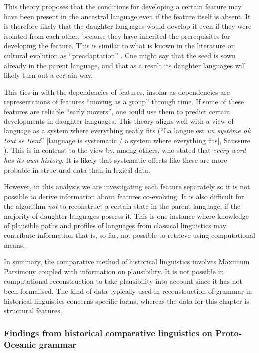 \documentclass[draft,10pt]{article} %
\begin{document}
This theory proposes that the conditions for developing a certain feature may have been present in the ancestral language even if the feature itself is absent. It is therefore likely that the daughter languages would develop it even if they were isolated from each other, because they have inherited the prerequisites for developing the feature. This is similar to what is known in the literature on cultural evolution as ``preadaptation'' \citep{scott2010language}. One might say that the seed is sown already in the parent language, and that as a result its daughter languages will likely turn out a certain way.

This ties in with the dependencies of features, insofar as dependencies are representations of features ``moving as a group'' through time. If some of these features are reliable ``early movers'', one could use them to predict certain developments in daughter languages. This theory aligns well with a view of language as a system where everything neatly fits (``La langue est \emph{un système où tout se tient}'' [language is systematic / a system where everything fits], Saussure \citep{koerner1997notes}). This is in contrast to the view by, among others, \citet[328]{bloomfield1933language} who stated that \emph{every word has its own history}. It is likely that systematic effects like these are more probable in structural data than in lexical data.

However, in this analysis we are investigating each feature separately so it is not possible to derive information about features co-evolving. It is also difficult for the algorithm \emph{not} to reconstruct a certain state in the parent language, if the majority of daughter languages possess it. This is one instance where knowledge of plausible paths and profiles of languages from classical linguistics may contribute information that is, so far, not possible to retrieve using computational means.

In summary, the comparative method of historical linguistics involves Maximum Parsimony coupled with information on plausibility. It is not possible in computational reconstruction to take plausibility into account since it has not been formalised. The kind of data typically used in reconstruction of grammar in historical linguistics concerns specific forms, whereas the data for this chapter is structural features.



\subsubsection{Findings from historical comparative linguistics on Proto-Oceanic grammar}
\label{sec:POC_lit_review}
\end{document}
